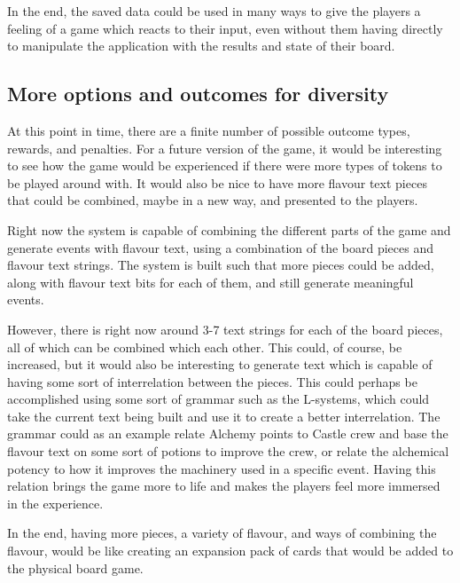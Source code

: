 In the end, the saved data could be used in many ways to give the players a feeling of a game which reacts to their input, even without them having directly to manipulate the application with the results and state of their board.

\subsection{More options and outcomes for diversity}
At this point in time, there are a finite number of possible outcome types, rewards, and penalties. For a future version of the game, it would be interesting to see how the game would be experienced if there were more types of tokens to be played around with. It would also be nice to have more flavour text pieces that could be combined, maybe in a new way, and presented to the players. 

Right now the system is capable of combining the different parts of the game and generate events with flavour text, using a combination of the board pieces and flavour text strings.
The system is built such that more pieces could be added, along with flavour text bits for each of them, and still generate meaningful events. 

However, there is right now around 3-7 text strings for each of the board pieces, all of which can be combined which each other. This could, of course, be increased, but it would also be interesting to generate text which is capable of having some sort of interrelation between the pieces. 
This could perhaps be accomplished using some sort of grammar such as the L-systems, which could take the current text being built and use it to create a better interrelation. 
The grammar could as an example relate Alchemy points to Castle crew and base the flavour text on some sort of potions to improve the crew, or relate the alchemical potency to how it improves the machinery used in a specific event. 
Having this relation brings the game more to life and makes the players feel more immersed in the experience.

In the end, having more pieces, a variety of flavour, and ways of combining the flavour, would be like creating an expansion pack of cards that would be added to the physical board game.

